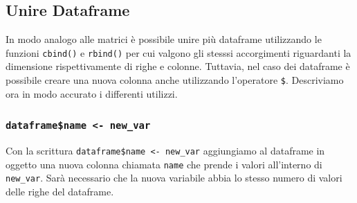 \documentclass[
]{book}
\newenvironment{Shaded}{\begin{snugshade}}{\end{snugshade}}
\newcommand{\CommentTok}[1]{\textcolor[rgb]{0.56,0.35,0.01}{\textit{#1}}}
\newcommand{\FloatTok}[1]{\textcolor[rgb]{0.00,0.00,0.81}{#1}}
\newcommand{\KeywordTok}[1]{\textcolor[rgb]{0.13,0.29,0.53}{\textbf{#1}}}
\newcommand{\NormalTok}[1]{#1}
\newcommand{\OperatorTok}[1]{\textcolor[rgb]{0.81,0.36,0.00}{\textbf{#1}}}
\newcommand{\StringTok}[1]{\textcolor[rgb]{0.31,0.60,0.02}{#1}}
\begin{document}
\hypertarget{unire-dataframe}{%
\subsection{Unire Dataframe}\label{unire-dataframe}}

In modo analogo alle matrici è possibile unire più dataframe utilizzando le funzioni \texttt{cbind()} e \texttt{rbind()} per cui valgono gli stesssi accorgimenti riguardanti la dimensione rispettivamente di righe e colonne. Tuttavia, nel caso dei dataframe è possibile creare una nuova colonna anche utilizzando l'operatore \texttt{\$}. Descriviamo ora in modo accurato i differenti utilizzi.

\hypertarget{dataframename---new_var}{%
\subsubsection*{\texorpdfstring{\texttt{dataframe\$name\ \textless{}-\ new\_var}}{dataframe\$name \textless- new\_var}}\label{dataframename---new_var}}

Con la scrittura \texttt{dataframe\$name\ \textless{}-\ new\_var} aggiungiamo al dataframe in oggetto una nuova colonna chiamata \texttt{name} che prende i valori all'interno di \texttt{new\_var}. Sarà necessario che la nuova variabile abbia lo stesso numero di valori delle righe del dataframe.

\begin{Shaded}
\end{Shaded}
\end{document}
